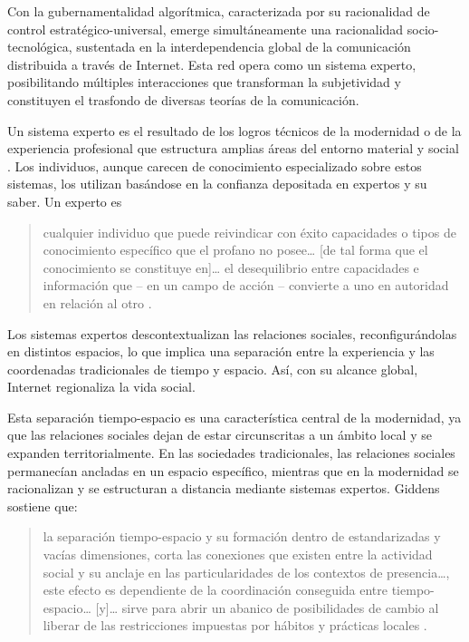 \documentclass[
  spanish,
  11pt,
  a4paper,
]{scrbook}
\begin{document}

Con la gubernamentalidad algorítmica, caracterizada por su racionalidad
de control estratégico-universal, emerge simultáneamente una
racionalidad socio-tecnológica, sustentada en la interdependencia global
de la comunicación distribuida a través de Internet. Esta red opera como
un sistema experto, posibilitando múltiples interacciones que
transforman la subjetividad y constituyen el trasfondo de diversas
teorías de la comunicación.

Un sistema experto es el resultado de los logros técnicos de la
modernidad o de la experiencia profesional que estructura amplias áreas
del entorno material y social \autocite{Giddens1993}. Los individuos,
aunque carecen de conocimiento especializado sobre estos sistemas, los
utilizan basándose en la confianza depositada en expertos y su saber. Un
experto es

\begin{quote}
cualquier individuo que puede reivindicar con éxito capacidades o tipos
de conocimiento específico que el profano no posee\ldots{} {[}de tal
forma que el conocimiento se constituye en{]}\ldots{} el desequilibrio
entre capacidades e información que -- en un campo de acción --
convierte a uno en autoridad en relación al otro
\autocite[109]{Giddens1993}.
\end{quote}

Los sistemas expertos descontextualizan las relaciones sociales,
reconfigurándolas en distintos espacios, lo que implica una separación
entre la experiencia y las coordenadas tradicionales de tiempo y
espacio. Así, con su alcance global, Internet regionaliza la vida
social.

Esta separación tiempo-espacio es una característica central de la
modernidad, ya que las relaciones sociales dejan de estar circunscritas
a un ámbito local y se expanden territorialmente. En las sociedades
tradicionales, las relaciones sociales permanecían ancladas en un
espacio específico, mientras que en la modernidad se racionalizan y se
estructuran a distancia mediante sistemas expertos. Giddens sostiene
que:

\begin{quote}
la separación tiempo-espacio y su formación dentro de estandarizadas y
vacías dimensiones, corta las conexiones que existen entre la actividad
social y su anclaje en las particularidades de los contextos de
presencia\ldots, este efecto es dependiente de la coordinación
conseguida entre tiempo-espacio\ldots{} {[}y{]}\ldots{} sirve para abrir
un abanico de posibilidades de cambio al liberar de las restricciones
impuestas por hábitos y prácticas locales \autocite[32]{Giddens1993}.
\end{quote}
\end{document}
